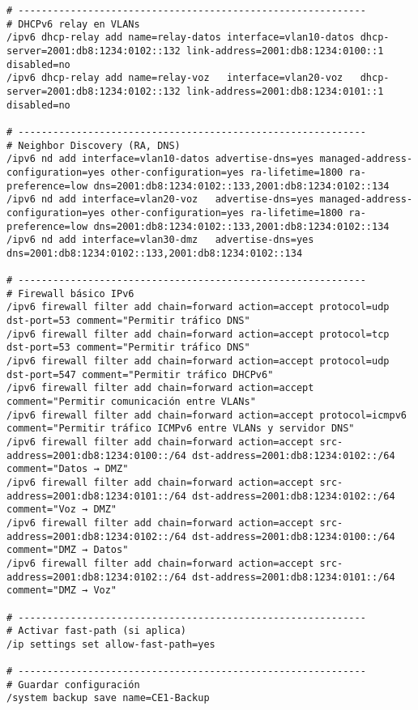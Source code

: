 \begin{lstlisting}[language=RouterOS]
# ------------------------------------------------------------
# DHCPv6 relay en VLANs
/ipv6 dhcp-relay add name=relay-datos interface=vlan10-datos dhcp-server=2001:db8:1234:0102::132 link-address=2001:db8:1234:0100::1 disabled=no
/ipv6 dhcp-relay add name=relay-voz   interface=vlan20-voz   dhcp-server=2001:db8:1234:0102::132 link-address=2001:db8:1234:0101::1 disabled=no

# ------------------------------------------------------------
# Neighbor Discovery (RA, DNS)
/ipv6 nd add interface=vlan10-datos advertise-dns=yes managed-address-configuration=yes other-configuration=yes ra-lifetime=1800 ra-preference=low dns=2001:db8:1234:0102::133,2001:db8:1234:0102::134
/ipv6 nd add interface=vlan20-voz   advertise-dns=yes managed-address-configuration=yes other-configuration=yes ra-lifetime=1800 ra-preference=low dns=2001:db8:1234:0102::133,2001:db8:1234:0102::134
/ipv6 nd add interface=vlan30-dmz   advertise-dns=yes dns=2001:db8:1234:0102::133,2001:db8:1234:0102::134

# ------------------------------------------------------------
# Firewall básico IPv6
/ipv6 firewall filter add chain=forward action=accept protocol=udp dst-port=53 comment="Permitir tráfico DNS"
/ipv6 firewall filter add chain=forward action=accept protocol=tcp dst-port=53 comment="Permitir tráfico DNS"
/ipv6 firewall filter add chain=forward action=accept protocol=udp dst-port=547 comment="Permitir tráfico DHCPv6"
/ipv6 firewall filter add chain=forward action=accept comment="Permitir comunicación entre VLANs"
/ipv6 firewall filter add chain=forward action=accept protocol=icmpv6 comment="Permitir tráfico ICMPv6 entre VLANs y servidor DNS"
/ipv6 firewall filter add chain=forward action=accept src-address=2001:db8:1234:0100::/64 dst-address=2001:db8:1234:0102::/64 comment="Datos → DMZ"
/ipv6 firewall filter add chain=forward action=accept src-address=2001:db8:1234:0101::/64 dst-address=2001:db8:1234:0102::/64 comment="Voz → DMZ"
/ipv6 firewall filter add chain=forward action=accept src-address=2001:db8:1234:0102::/64 dst-address=2001:db8:1234:0100::/64 comment="DMZ → Datos"
/ipv6 firewall filter add chain=forward action=accept src-address=2001:db8:1234:0102::/64 dst-address=2001:db8:1234:0101::/64 comment="DMZ → Voz"

# ------------------------------------------------------------
# Activar fast-path (si aplica)
/ip settings set allow-fast-path=yes

# ------------------------------------------------------------
# Guardar configuración
/system backup save name=CE1-Backup
\end{lstlisting}

